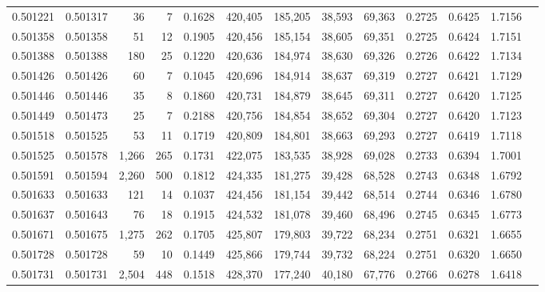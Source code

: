 \begin{tabular}{rrrrrrrrrrrrr}
0.501221 & 0.501317 &    36 &     7 &                                     0.1628 & 420,405 & 185,205 &  38,593 &  69,363 & 0.2725 & 0.6425 & 1.7156 \\
0.501358 & 0.501358 &    51 &    12 &                                     0.1905 & 420,456 & 185,154 &  38,605 &  69,351 & 0.2725 & 0.6424 & 1.7151 \\
0.501388 & 0.501388 &   180 &    25 &                                     0.1220 & 420,636 & 184,974 &  38,630 &  69,326 & 0.2726 & 0.6422 & 1.7134 \\
0.501426 & 0.501426 &    60 &     7 &                                     0.1045 & 420,696 & 184,914 &  38,637 &  69,319 & 0.2727 & 0.6421 & 1.7129 \\
0.501446 & 0.501446 &    35 &     8 &                                     0.1860 & 420,731 & 184,879 &  38,645 &  69,311 & 0.2727 & 0.6420 & 1.7125 \\
0.501449 & 0.501473 &    25 &     7 &                                     0.2188 & 420,756 & 184,854 &  38,652 &  69,304 & 0.2727 & 0.6420 & 1.7123 \\
0.501518 & 0.501525 &    53 &    11 &                                     0.1719 & 420,809 & 184,801 &  38,663 &  69,293 & 0.2727 & 0.6419 & 1.7118 \\
0.501525 & 0.501578 & 1,266 &   265 &                                     0.1731 & 422,075 & 183,535 &  38,928 &  69,028 & 0.2733 & 0.6394 & 1.7001 \\
0.501591 & 0.501594 & 2,260 &   500 &                                     0.1812 & 424,335 & 181,275 &  39,428 &  68,528 & 0.2743 & 0.6348 & 1.6792 \\
0.501633 & 0.501633 &   121 &    14 &                                     0.1037 & 424,456 & 181,154 &  39,442 &  68,514 & 0.2744 & 0.6346 & 1.6780 \\
0.501637 & 0.501643 &    76 &    18 &                                     0.1915 & 424,532 & 181,078 &  39,460 &  68,496 & 0.2745 & 0.6345 & 1.6773 \\
0.501671 & 0.501675 & 1,275 &   262 &                                     0.1705 & 425,807 & 179,803 &  39,722 &  68,234 & 0.2751 & 0.6321 & 1.6655 \\
0.501728 & 0.501728 &    59 &    10 &                                     0.1449 & 425,866 & 179,744 &  39,732 &  68,224 & 0.2751 & 0.6320 & 1.6650 \\
0.501731 & 0.501731 & 2,504 &   448 &                                     0.1518 & 428,370 & 177,240 &  40,180 &  67,776 & 0.2766 & 0.6278 & 1.6418 \\

\end{tabular}
